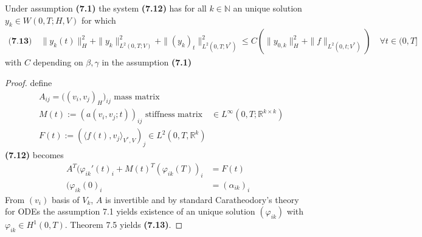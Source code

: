 \begin{theorem}
	Under assumption \textbf{(7.1)} the system \textbf{(7.12)} has for all $k \in \mathbb{N}$ an unique solution $y_k \in W(0, T; H, V)$ for which
	\begin{align*}\textbf{(7.13)} \quad
		\|y_k(t)\|_H^2 + \|y_k\|_{L^2(0, T;V)}^2 + \|(y_k)_t\|^2_{L^2(0, T;V^*)} \le C (\|y_{0, k}\|_H^2 + \|f\|_{L^2(0, t;V^*)}) \quad \forall t \in (0, T]
	\end{align*}
	with $C$ depending on $\beta, \gamma$ in the assumption \textbf{(7.1)}
\end{theorem}
\begin{proof}
	define
	\begin{align*}
		&A_{ij} = \bigg((v_i, v_j)_H\bigg)_{ij} \text{ mass matrix}\\
		&M(t):= (a(v_i, v_j ; t))_{ij} \text{ stiffness matrix} \quad \in L^\infty(0, T; \mathbb{R}^{k \times k})\\
		&F(t):= (\langle f(t), v_j\rangle_{V^*, V})_j \in L^2(0, T, \mathbb{R}^k)
	\end{align*}
	\textbf{(7.12)} becomes
	\begin{align*}
		A^T(\varphi_{ik}'(t)_i + M(t)^T(\varphi_{ik}(T))_i &= F(t)\\
		(\varphi_{ik}(0)_i &= (\alpha_{ik})_i
	\end{align*}
	From $(v_i)$ basis of $V_k$, $A$ is invertible and by standard Caratheodory's theory for ODEs the assumption 7.1 yields existence of an unique solution $(\varphi_{ik})$ with $\varphi_{ik} \in H^1(0, T)$. Theorem 7.5 yields \textbf{(7.13)}.
\end{proof}

